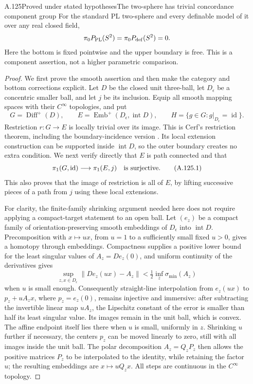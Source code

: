 \begin{saresult}{A.125}{Proved under stated hypotheses}{The two-sphere has trivial concordance component group}
For the standard PL two-sphere and every definable model of it over
any real closed field,
\[
 \pi_0P_{\rm PL}(S^2)=\pi_0P_{\rm def}(S^2)=0.
\]
Here the bottom is fixed pointwise and the upper boundary is free.
This is a component assertion, not a higher parametric comparison.
\end{saresult}
\begin{proof}
We first prove the smooth assertion and then make the category and
bottom corrections explicit. Let $D$ be the closed unit three-ball,
let $D_\epsilon$ be a concentric smaller ball, and let $j$ be its
inclusion. Equip all smooth mapping spaces with their $C^\infty$
topologies, and put
\[
 G=\operatorname{Diff}^+(D),\qquad
 E=\operatorname{Emb}^+(D_\epsilon,\operatorname{int}D),\qquad
 H=\{g\in G:g|_{D_\epsilon}=\operatorname{id}\}.
\]
Restriction $r:G\to E$ is locally trivial over its image. This is
Cerf's restriction theorem, including the boundary-incidence version
\cite[Theorem~1, p.~8-01, and Section~2.3, p.~8-05]{Cerf1962Fibration}.
Its local extension construction can be supported inside
$\operatorname{int}D$, so the outer boundary creates no extra
condition. We next verify directly that $E$ is path connected and
that
\[
 \pi_1(G,\operatorname{id})\longrightarrow\pi_1(E,j)
 \quad\hbox{is surjective}.                                  \tag{A.125.1}
\]
This also proves that the image of restriction is all of $E$, by
lifting successive pieces of a path from $j$ using these local
extensions.

For clarity, the finite-family shrinking argument needed here does
not require applying a compact-target statement to an open ball.
Let $(e_z)$ be a compact family of orientation-preserving smooth
embeddings of $D_\epsilon$ into $\operatorname{int}D$. Precomposition
with $x\mapsto ux$, from $u=1$ to a sufficiently small fixed $u>0$,
gives a homotopy through embeddings. Compactness supplies a positive
lower bound for the least singular values of $A_z=De_z(0)$, and
uniform continuity of the derivatives gives
\[
 \sup_{z,x\in D_\epsilon}\|De_z(ux)-A_z\|
 <\tfrac12\inf_z\sigma_{\min}(A_z)
\]
when $u$ is small enough. Consequently straight-line interpolation
from $e_z(ux)$ to $p_z+uA_zx$, where $p_z=e_z(0)$, remains injective
and immersive: after subtracting the invertible linear map $uA_z$,
the Lipschitz constant of the error is smaller than half its least
singular value. Its images remain in the unit ball, which is convex.
The affine endpoint itself lies there when $u$ is small, uniformly
in $z$. Shrinking $u$ further if necessary, the centers $p_z$ can be
moved linearly to zero, still with all images inside the unit ball.
The polar decomposition $A_z=Q_zP_z$ then allows the positive
matrices $P_z$ to be interpolated to the identity, while retaining
the factor $u$; the resulting embeddings are $x\mapsto uQ_zx$.
All steps are continuous in the $C^\infty$ topology.


\end{proof}
